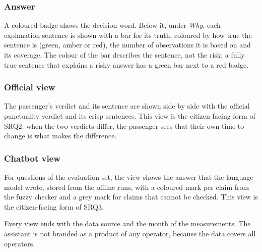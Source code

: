 \subsubsection*{Answer} A coloured badge shows the decision word. Below it, under \emph{Why},
each explanation sentence is shown with a bar for its truth, coloured by how true the
sentence is (green, amber or red), the number of observations it is based on and its
coverage. The colour of the bar describes the sentence, not the risk: a fully true sentence
that explains a risky answer has a green bar next to a red badge.

\subsubsection*{Official view} The passenger's verdict and its sentence are shown side by side
with the official punctuality verdict and its crisp sentences. This view is the
citizen-facing form of SRQ2: when the two verdicts differ, the passenger sees that their own
time to change is what makes the difference.

\subsubsection*{Chatbot view} For questions of the evaluation set, the view shows the answer
that the language model wrote, stored from the offline runs, with a coloured mark per claim
from the fuzzy checker and a grey mark for claims that cannot be checked. This view is the
citizen-facing form of SRQ3.

Every view ends with the data source and the month of the measurements. The assistant is not
branded as a product of any operator, because the data covers all operators.

